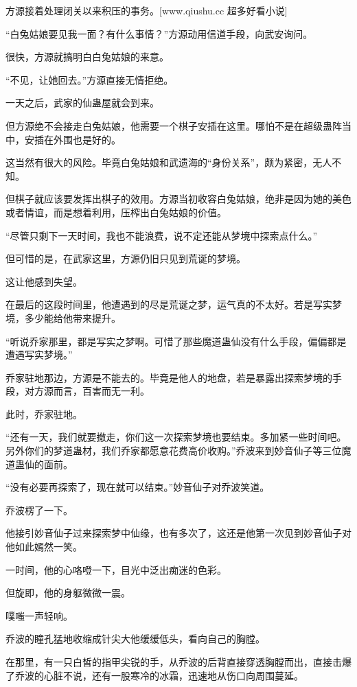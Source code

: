 
\begin{this_body}

方源接着处理闭关以来积压的事务。[www.qiushu.cc 超多好看小说]

“白兔姑娘要见我一面？有什么事情？”方源动用信道手段，向武安询问。

很快，方源就搞明白白兔姑娘的来意。

“不见，让她回去。”方源直接无情拒绝。

一天之后，武家的仙蛊屋就会到来。

但方源绝不会接走白兔姑娘，他需要一个棋子安插在这里。哪怕不是在超级蛊阵当中，安插在外围也是好的。

这当然有很大的风险。毕竟白兔姑娘和武遗海的“身份关系”，颇为紧密，无人不知。

但棋子就应该要发挥出棋子的效用。方源当初收容白兔姑娘，绝非是因为她的美色或者情谊，而是想着利用，压榨出白兔姑娘的价值。

“尽管只剩下一天时间，我也不能浪费，说不定还能从梦境中探索点什么。”

但可惜的是，在武家这里，方源仍旧只见到荒诞的梦境。

这让他感到失望。

在最后的这段时间里，他遭遇到的尽是荒诞之梦，运气真的不太好。若是写实梦境，多少能给他带来提升。

“听说乔家那里，都是写实之梦啊。可惜了那些魔道蛊仙没有什么手段，偏偏都是遭遇写实梦境。”

乔家驻地那边，方源是不能去的。毕竟是他人的地盘，若是暴露出探索梦境的手段，对方源而言，百害而无一利。

此时，乔家驻地。

“还有一天，我们就要撤走，你们这一次探索梦境也要结束。多加紧一些时间吧。另外你们的梦道蛊材，我们乔家都愿意花费高价收购。”乔波来到妙音仙子等三位魔道蛊仙的面前。

“没有必要再探索了，现在就可以结束。”妙音仙子对乔波笑道。

乔波楞了一下。

他接引妙音仙子过来探索梦中仙缘，也有多次了，这还是他第一次见到妙音仙子对他如此嫣然一笑。

一时间，他的心咯噔一下，目光中泛出痴迷的色彩。

但旋即，他的身躯微微一震。

噗嗤一声轻响。

乔波的瞳孔猛地收缩成针尖大他缓缓低头，看向自己的胸膛。

在那里，有一只白皙的指甲尖锐的手，从乔波的后背直接穿透胸膛而出，直接击爆了乔波的心脏不说，还有一股寒冷的冰霜，迅速地从伤口向周围蔓延。


\end{this_body}
